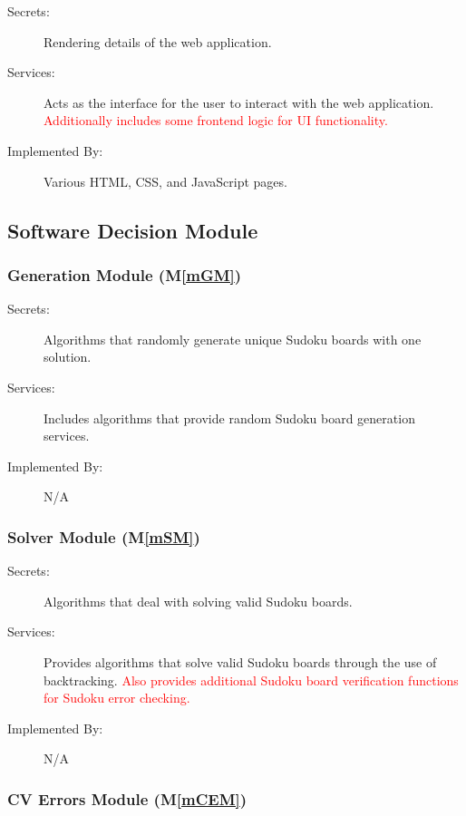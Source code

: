 \documentclass[12pt, titlepage]{article}
\newcommand{\mref}[1]{M\ref{#1}}
\begin{document}
\begin{description}
\item[Secrets:] Rendering details of the web application.
\item[Services:] Acts as the interface for the user to interact with the web application. \textcolor{red}{Additionally includes some frontend logic for UI functionality.}
\item[Implemented By:] Various HTML, CSS, and JavaScript pages.
\end{description}


\subsection{Software Decision Module}

\subsubsection{Generation Module (\mref{mGM})}

\begin{description}
\item[Secrets:] Algorithms that randomly generate unique Sudoku boards with one solution.
\item[Services:] Includes algorithms that provide random Sudoku board generation services.
\item[Implemented By:] N/A
\end{description}

\subsubsection{Solver Module (\mref{mSM})}

\begin{description}
\item[Secrets:] Algorithms that deal with solving valid Sudoku boards.
\item[Services:] Provides algorithms that solve valid Sudoku boards through the use of backtracking. \textcolor{red}{Also provides additional Sudoku board verification functions for Sudoku error checking.}
\item[Implemented By:] N/A
\end{description}

\subsubsection{CV Errors Module (\mref{mCEM})}
\end{document}
